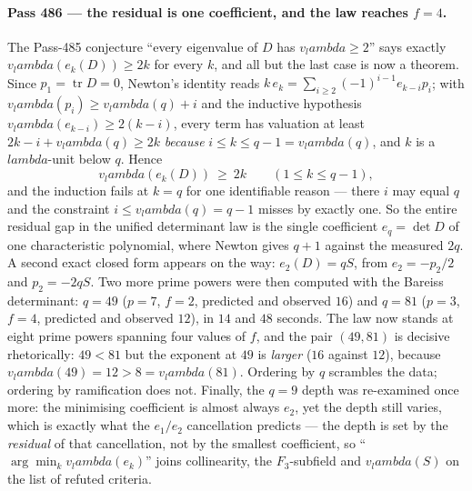 \documentclass[12pt,a4paper]{article}
\def\mathbb#1{#1}%
\def\textbf#1{#1}%
\def\lambda{lambda}%
\theoremstyle{definition}
\newcommand{\FF}{\mathbb{F}}
\begin{document}
\paragraph{Pass 486 --- the residual is one coefficient, and the law reaches
$f=4$.}
The Pass-485 conjecture ``every eigenvalue of $D$ has $v_\lambda\ge2$'' says
exactly $v_\lambda(e_k(D))\ge2k$ for every $k$, and all but the last case is
now a theorem.  Since $p_1=\operatorname{tr}D=0$, Newton's identity reads
$k\,e_k=\sum_{i\ge2}(-1)^{i-1}e_{k-i}p_i$; with $v_\lambda(p_i)\ge v_\lambda(q)+i$
and the inductive hypothesis $v_\lambda(e_{k-i})\ge2(k-i)$, every term has
valuation at least $2k-i+v_\lambda(q)\ge2k$ \emph{because}
$i\le k\le q-1=v_\lambda(q)$, and $k$ is a $\lambda$-unit below $q$.  Hence
\[
v_\lambda(e_k(D))\ \ge\ 2k \qquad (1\le k\le q-1),
\]
and the induction fails at $k=q$ for one identifiable reason --- there $i$ may
equal $q$ and the constraint $i\le v_\lambda(q)=q-1$ misses by exactly one.
\textbf{So the entire residual gap in the unified determinant law is the single
coefficient $e_q=\det D$ of one characteristic polynomial}, where Newton gives
$q+1$ against the measured $2q$.  A second exact closed form appears on the
way: $e_2(D)=qS$, from $e_2=-p_2/2$ and $p_2=-2qS$.  Two more prime powers were
then computed with the Bareiss determinant: \textbf{$q=49$} ($p=7$, $f=2$,
predicted and observed $16$) and \textbf{$q=81$} ($p=3$, $f=4$, predicted and
observed $12$), in $14$ and $48$ seconds.  The law now stands at eight prime
powers spanning four values of $f$, and the pair $(49,81)$ is decisive
rhetorically: $49<81$ but the exponent at $49$ is \emph{larger} ($16$ against
$12$), because $v_\lambda(49)=12>8=v_\lambda(81)$.  Ordering by $q$ scrambles
the data; ordering by ramification does not.  Finally, the $q=9$ depth was
re-examined once more: the minimising coefficient is almost always $e_2$, yet
the depth still varies, which is exactly what the $e_1/e_2$ cancellation
predicts --- the depth is set by the \emph{residual} of that cancellation, not
by the smallest coefficient, so ``$\arg\min_k v_\lambda(e_k)$'' joins
collinearity, the $\FF_3$-subfield and $v_\lambda(S)$ on the list of refuted
criteria.
\end{document}
